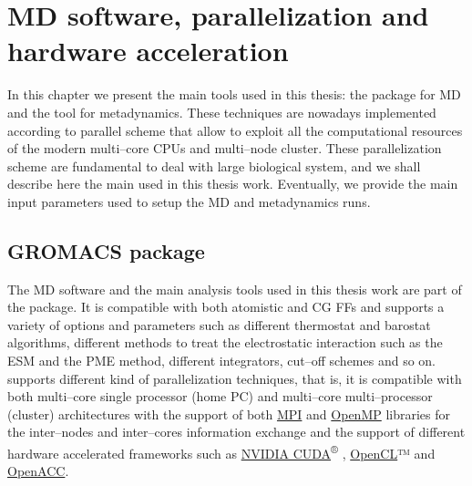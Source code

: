 \chapter{MD software, parallelization and hardware acceleration}
\label{chap:software}
In this chapter we present the main tools used in this thesis: the \href{http://www.gromacs.org}{\gromacs} 
package for \ac{MD} and the \href{http://www.plumed.org}{\plumed} tool for metadynamics. These techniques are 
nowadays implemented according to parallel scheme that allow to exploit all the computational resources of the 
modern multi--core CPUs and multi--node cluster. These parallelization scheme are fundamental to deal with large 
biological system, and we shall describe here the main used in this thesis work. Eventually, we provide the main 
input parameters used to setup the \ac{MD} and metadynamics runs. 


\section{GROMACS package}
The \ac{MD} software and the main analysis tools used in this thesis work are part of the 
\href{http://www.gromacs.org}{\gromacs}\cite{gromacsManual} package. It is compatible with both atomistic and 
\ac{CG} \acp{FF} and supports a variety of options and parameters such as different thermostat and barostat 
algorithms, different methods to treat the electrostatic interaction such as the \ac{ESM} and the \ac{PME} 
method, different integrators, cut--off schemes and so on. \gromacs supports different kind of parallelization 
techniques, that is, it is compatible with both multi--core single processor (home PC) and multi--core 
multi--processor (cluster) architectures with the support of both 
\href{https://computing.llnl.gov/tutorials/mpi/}{MPI}
and \href{https://computing.llnl.gov/tutorials/openMP/}{OpenMP}
libraries for the inter--nodes and inter--cores information exchange and the support of different hardware 
accelerated frameworks such as \href{https://developer.nvidia.com/cuda-zone}{NVIDIA CUDA}\textsuperscript{®}
, \href{https://www.khronos.org/opencl/}{OpenCL}™
 and \href{http://www.openacc.org}{OpenACC}.

